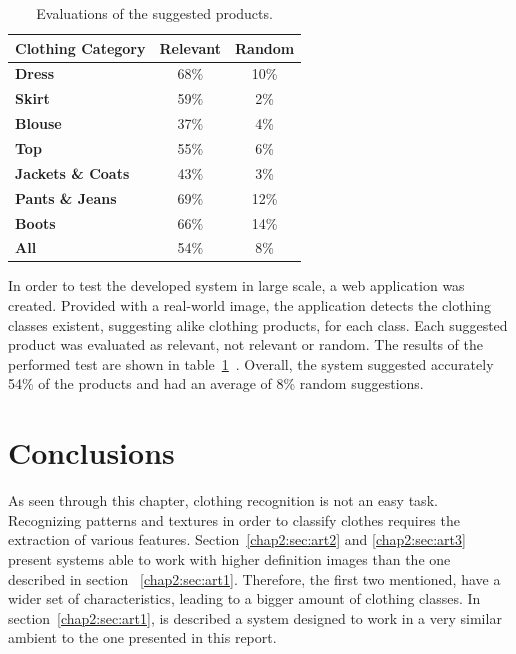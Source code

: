 \documentclass[titlepage,12pt,a4paper,times]{book}
\begin{document}
\begin{table}
\centering
\begin{tabular}{|l|c|c|}
\hline
\textbf{Clothing Category} & \textbf{Relevant} & \textbf{Random}\\
\hline
\hline
\textbf{Dress} & 68\% & 10\% \\
\hline
\textbf{Skirt} & 59\% & 2\% \\
\hline
\textbf{Blouse} & 37\% & 4\% \\
\hline
\textbf{Top} & 55\% & 6\% \\
\hline
\textbf{Jackets \& Coats} & 43\% & 3\% \\
\hline
\textbf{Pants \& Jeans} & 69\% & 12\% \\
\hline
\textbf{Boots} & 66\% & 14\% \\
\hline
\hline
\textbf{All} & 54\% & 8\% \\
\hline
\end{tabular}
\caption{Evaluations of the suggested products.}
\label{tab:uesp}
\end{table}
\FloatBarrier

In order to test the developed system in large scale, a web application was
created. Provided with a real-world image, the application detects the clothing
classes existent, suggesting alike clothing products, for each class. Each
suggested product was evaluated as relevant, not relevant or random. The
results of the performed test are shown in table~\ref{tab:uesp}~\citep{3}.
Overall, the system suggested accurately 54\% of the products and had an
average of 8\% random suggestions.



\section{Conclusions}
\label{chap2:sec:concs}

As seen through this chapter, clothing recognition is not an easy task.
Recognizing patterns and textures in order to classify clothes requires the
extraction of various features. Section~\ref{chap2:sec:art2} and
\ref{chap2:sec:art3} present systems able to work with higher definition images
than the one described in section ~\ref{chap2:sec:art1}. Therefore, the first
two mentioned, have a wider set of characteristics, leading to a bigger amount
of clothing classes. In section~\ref{chap2:sec:art1}, is described a system
designed to work in a very similar ambient to the one presented in this
report.
\end{document}
